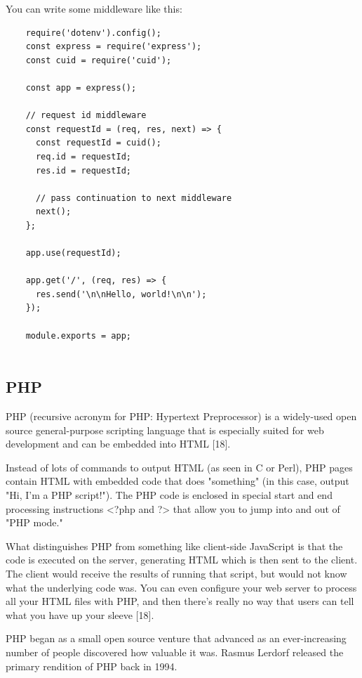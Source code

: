 \documentclass[../thesis.tex]{subfiles}
\begin{document}
You can write some middleware like this:
\begin{lstlisting}
    require('dotenv').config();
    const express = require('express');
    const cuid = require('cuid');
    
    const app = express();
    
    // request id middleware
    const requestId = (req, res, next) => {
      const requestId = cuid();
      req.id = requestId;
      res.id = requestId;
    
      // pass continuation to next middleware
      next();
    };
    
    app.use(requestId);
    
    app.get('/', (req, res) => {
      res.send('\n\nHello, world!\n\n');
    });
    
    module.exports = app;
    
\end{lstlisting}
\newpage

\subsection{PHP}
PHP (recursive acronym for PHP: Hypertext Preprocessor) is a widely-used open source general-purpose scripting language that is especially suited for web development and can be embedded into HTML [18].
\newline

Instead of lots of commands to output HTML (as seen in C or Perl), PHP pages contain HTML with embedded code that does "something" (in this case, output "Hi, I'm a PHP script!"). The PHP code is enclosed in special start and end processing instructions <?php and ?> that allow you to jump into and out of "PHP mode."
\newline
    
What distinguishes PHP from something like client-side JavaScript is that the code is executed on the server, generating HTML which is then sent to the client. The client would receive the results of running that script, but would not know what the underlying code was. You can even configure your web server to process all your HTML files with PHP, and then there's really no way that users can tell what you have up your sleeve [18].
\newline

PHP began as a small open source venture that advanced as an ever-increasing number of people discovered how valuable it was. Rasmus Lerdorf released the primary rendition of PHP back in 1994.
\newline
    
\end{document}
